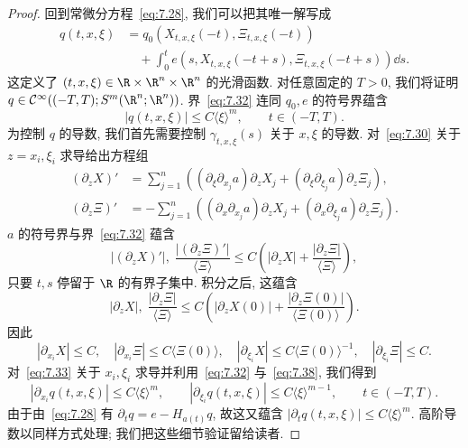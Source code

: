 \begin{proof}
回到常微分方程~\eqref{eq:7.28}, 我们可以把其唯一解写成
\begin{equation}\label{eq:7.33}
    \begin{aligned}
        q(t, x, \xi) &= q_0(X_{t, x, \xi}(-t), \Xi_{t, x, \xi}(-t)) \\
        &\quad + \int_0^t e(s, X_{t, x, \xi}(-t + s), \Xi_{t, x, \xi}(-t + s)) \dd s.
    \end{aligned}
\end{equation}
这定义了 $(t, x, \xi) \in \R \times \R^n \times \R^n$ 的光滑函数. 对任意固定的 $T > 0$, 我们将证明 $q \in \Smooth((-T, T); S^m(\R^n; \R^n))$. 界~\eqref{eq:7.32} 连同 $q_0, e$ 的符号界蕴含
\begin{equation}\label{eq:7.34}
    | q(t, x, \xi) | \le C \langle \xi \rangle^m, \qquad t \in (-T, T).
\end{equation}
为控制 $q$ 的导数, 我们首先需要控制 $\gamma_{t, x, \xi}(s)$ 关于 $x, \xi$ 的导数. 对~\eqref{eq:7.30} 关于 $z = x_i, \xi_i$ 求导给出方程组
\begin{equation}\label{eq:7.35}
    \begin{aligned}
        (\partial_z X)' &= \sum_{j=1}^n \left( (\partial_\xi \partial_{x_j} a) \partial_z X_j + (\partial_\xi \partial_{\xi_j} a) \partial_z \Xi_j \right), \\
        (\partial_z \Xi)' &= -\sum_{j=1}^n \left( (\partial_x \partial_{x_j} a) \partial_z X_j + (\partial_x \partial_{\xi_j} a) \partial_z \Xi_j \right).
    \end{aligned}
\end{equation}
$a$ 的符号界与界~\eqref{eq:7.32} 蕴含
\begin{equation}\label{eq:7.36}
    \left| (\partial_z X)' \right|, \; \frac{\left| (\partial_z \Xi)' \right|}{\langle \Xi \rangle}
    \le C \left( | \partial_z X | + \frac{| \partial_z \Xi |}{\langle \Xi \rangle} \right),
\end{equation}
只要 $t, s$ 停留于 $\R$ 的有界子集中. 积分之后, 这蕴含
\begin{equation}\label{eq:7.37}
    | \partial_z X |, \; \frac{| \partial_z \Xi |}{\langle \Xi \rangle}
    \le C \left( | \partial_z X(0) | + \frac{| \partial_z \Xi(0) |}{\langle \Xi(0) \rangle} \right).
\end{equation}
因此
\begin{equation}\label{eq:7.38}
    | \partial_{x_i} X | \le C, \quad
    | \partial_{x_i} \Xi | \le C \langle \Xi(0) \rangle, \quad
    | \partial_{\xi_i} X | \le C \langle \Xi(0) \rangle^{-1}, \quad
    | \partial_{\xi_i} \Xi | \le C.
\end{equation}
对~\eqref{eq:7.33} 关于 $x_i, \xi_i$ 求导并利用~\eqref{eq:7.32} 与~\eqref{eq:7.38}, 我们得到
\begin{equation}\label{eq:7.39}
    \left| \partial_{x_i} q(t, x, \xi) \right| \le C \langle \xi \rangle^m, \qquad
    \left| \partial_{\xi_i} q(t, x, \xi) \right| \le C \langle \xi \rangle^{m-1}, \qquad t \in (-T, T).
\end{equation}
由于由~\eqref{eq:7.28} 有 $\partial_t q = e - H_{a(t)} q$, 故这又蕴含 $| \partial_t q(t, x, \xi) | \le C \langle \xi \rangle^m$. 高阶导数以同样方式处理; 我们把这些细节验证留给读者.
\end{proof}

